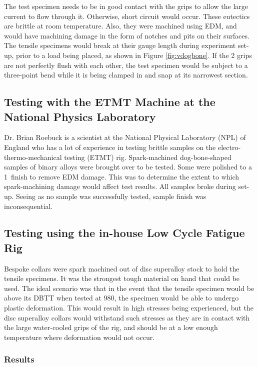 The test specimen needs to be in good contact with the grips to allow the large current to flow through it.  Otherwise, short circuit would occur.  These eutectics are brittle at room temperature.  Also, they were machined using EDM, and would have machining damage in the form of notches and pits on their surfaces.
The tensile specimens would break at their gauge length during experiment set-up, prior to a load being placed, as shown in Figure \ref{fig:vdogbone}.  If the 2 grips are not perfectly flush with each other, the test specimen would be subject to a three-point bend while it is being clamped in and snap at its narrowest section.

\subsection{Testing with the ETMT Machine at the National Physics Laboratory}

Dr. Brian Roebuck is a scientist at the National Physical Laboratory (NPL) of England who has a lot of experience in testing brittle samples on the electro-thermo-mechanical testing (ETMT) rig.
Spark-machined dog-bone-shaped samples of binary alloys were brought over to be tested.  Some were polished to a 1\micro\metre\ finish to remove EDM damage.  This was to determine the extent to which spark-machining damage would affect test results.  All samples broke during set-up.  Seeing as no sample was successfully tested, sample finish was inconsequential.  


\subsection{Testing using the in-house Low Cycle Fatigue Rig}

Bespoke collars were spark machined out of disc superalloy stock to hold the tensile specimens.  It was the strongest tough material on hand that could be used.  The ideal scenario was that in the event that the tensile specimen would be above its DBTT when tested at 980\celsius, the specimen would be able to undergo plastic deformation.  This would result in high stresses being experienced, but the disc superalloy collars would withstand such stresses as they are in contact with the large water-cooled grips of the rig, and should be at a low enough temperature where deformation would not occur.


\subsubsection{Results}

